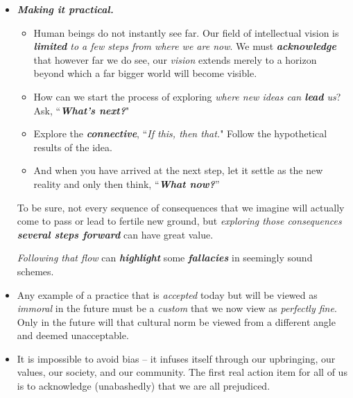 \documentclass[11pt]{article}
\begin{document}
\begin{itemize}
\item \emph{\textbf{Making it practical.}} 
\begin{itemize}
\item Human beings do not instantly see far. Our field of intellectual vision is \emph{\textbf{limited} to a few steps from where we are now}. We must \textbf{\emph{acknowledge}} that however far we do see, our \emph{vision} extends merely to a horizon beyond which a far bigger world will become visible.

\item How can we start the process of exploring \emph{where new ideas can \textbf{lead} us}? Ask, ``\emph{\textbf{What’s next?}}" 

\item Explore the \emph{\textbf{connective}}, ``\emph{If this, then that.}" Follow the hypothetical results of the idea. 

\item And when you have arrived at the next step, let it settle as the new reality and only then think, “\emph{\textbf{What now?}}”
\end{itemize}
To be sure, not every sequence of consequences that we imagine will actually come to pass or lead to fertile new ground, but \emph{exploring those consequences} \emph{\textbf{several steps forward}} can have great value. 

\emph{Following that flow} can \emph{\textbf{highlight}} some \emph{\textbf{fallacies}} in seemingly sound schemes. 


\item Any example of a practice that is \emph{accepted} today but will be viewed as \emph{immoral} in the future must be a \emph{custom} that we now view as \emph{perfectly fine}. Only in the future will that cultural norm be viewed from a different angle and deemed unacceptable.

\item It is impossible to avoid bias -- it infuses itself through our upbringing, our values, our society, and our community. The first real action item for all of us is to acknowledge (unabashedly) that we are all prejudiced.
\end{itemize}
\end{document}
